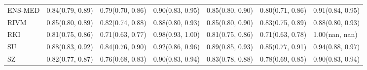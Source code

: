 \begin{tabular}{l p{} p{} p{} p{} p{} p{}}
ENS-MED & {0.84\newline(0.79, 0.89)} & {0.79\newline(0.70, 0.86)} & {0.90\newline(0.83, 0.95)} & {0.85\newline(0.80, 0.90)} & {0.80\newline(0.71, 0.86)} & {0.91\newline(0.84, 0.95)} \\
RIVM & {0.85\newline(0.80, 0.89)} & {0.82\newline(0.74, 0.88)} & {0.88\newline(0.80, 0.93)} & {0.85\newline(0.80, 0.90)} & {0.83\newline(0.75, 0.89)} & {0.88\newline(0.80, 0.93)} \\
RKI & {0.81\newline(0.75, 0.86)} & {0.71\newline(0.63, 0.77)} & {0.98\newline(0.93, 1.00)} & {0.81\newline(0.75, 0.86)} & {0.71\newline(0.63, 0.78)} & {1.00\newline(nan, nan)} \\
SU & {0.88\newline(0.83, 0.92)} & {0.84\newline(0.76, 0.90)} & {0.92\newline(0.86, 0.96)} & {0.89\newline(0.85, 0.93)} & {0.85\newline(0.77, 0.91)} & {0.94\newline(0.88, 0.97)} \\
SZ & {0.82\newline(0.77, 0.87)} & {0.76\newline(0.68, 0.83)} & {0.90\newline(0.83, 0.94)} & {0.83\newline(0.78, 0.88)} & {0.78\newline(0.69, 0.85)} & {0.90\newline(0.83, 0.94)} \\
\bottomrule
\end{tabular}
